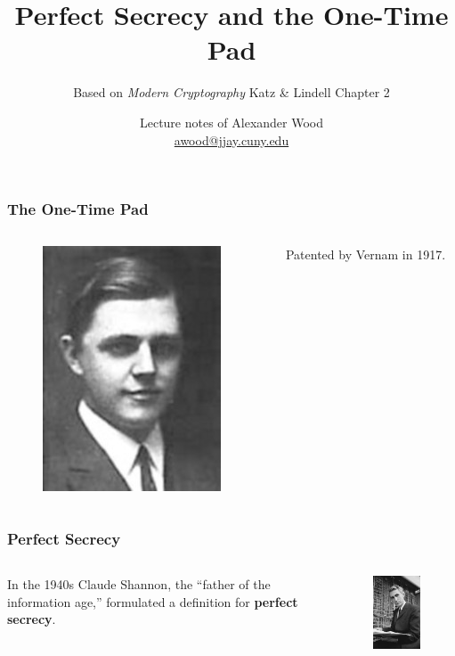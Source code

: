 \documentclass{beamer}
\title[OTP]{Perfect Secrecy and the One-Time Pad}
\subtitle{Based on \emph{Modern Cryptography} Katz \& Lindell Chapter 2}
\author
{Lecture notes of Alexander Wood \\ \scriptsize \href{mailto:awood@jjay.cuny.edu}{awood@jjay.cuny.edu}}
\institute[JJay]{John Jay College of Criminal Justice}
\date{}
\newcommand{\<}{\langle}
\renewcommand{\>}{\rangle}
\begin{document}

\begin{frame}
  \titlepage
\end{frame}

\begin{frame}
\frametitle{The One-Time Pad}

\begin{columns}
\begin{column}{0.5\textwidth}
\begin{figure}
\includegraphics[scale=.5]{IMG/vernam}
\end{figure}
\end{column}
\begin{column}{0.5\textwidth}
Patented by Vernam in 1917.
\end{column}
\end{columns}
\end{frame}


\begin{frame}
\frametitle{Perfect Secrecy}

\begin{columns}
\begin{column}{0.4\textwidth}
In the 1940s Claude Shannon, the ``father of the information age,'' formulated a definition for \textbf{perfect secrecy}.
\end{column}
\begin{column}{0.5\textwidth}
\begin{figure}
\includegraphics[scale=.7]{IMG/shannon}
\end{figure}
\end{column}
\end{columns}
\end{frame}
\end{document}
